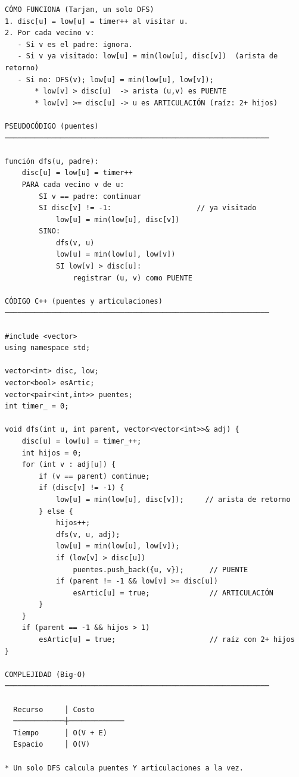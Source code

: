 \begin{lstlisting}
CÓMO FUNCIONA (Tarjan, un solo DFS)
1. disc[u] = low[u] = timer++ al visitar u.
2. Por cada vecino v:
   - Si v es el padre: ignora.
   - Si v ya visitado: low[u] = min(low[u], disc[v])  (arista de retorno)
   - Si no: DFS(v); low[u] = min(low[u], low[v]);
       * low[v] > disc[u]  -> arista (u,v) es PUENTE
       * low[v] >= disc[u] -> u es ARTICULACIÓN (raíz: 2+ hijos)

PSEUDOCÓDIGO (puentes)
──────────────────────────────────────────────────────────────

función dfs(u, padre):
    disc[u] = low[u] = timer++
    PARA cada vecino v de u:
        SI v == padre: continuar
        SI disc[v] != -1:                    // ya visitado
            low[u] = min(low[u], disc[v])
        SINO:
            dfs(v, u)
            low[u] = min(low[u], low[v])
            SI low[v] > disc[u]:
                registrar (u, v) como PUENTE

CÓDIGO C++ (puentes y articulaciones)
──────────────────────────────────────────────────────────────

#include <vector>
using namespace std;

vector<int> disc, low;
vector<bool> esArtic;
vector<pair<int,int>> puentes;
int timer_ = 0;

void dfs(int u, int parent, vector<vector<int>>& adj) {
    disc[u] = low[u] = timer_++;
    int hijos = 0;
    for (int v : adj[u]) {
        if (v == parent) continue;
        if (disc[v] != -1) {
            low[u] = min(low[u], disc[v]);     // arista de retorno
        } else {
            hijos++;
            dfs(v, u, adj);
            low[u] = min(low[u], low[v]);
            if (low[v] > disc[u])
                puentes.push_back({u, v});      // PUENTE
            if (parent != -1 && low[v] >= disc[u])
                esArtic[u] = true;              // ARTICULACIÓN
        }
    }
    if (parent == -1 && hijos > 1)
        esArtic[u] = true;                      // raíz con 2+ hijos
}

COMPLEJIDAD (Big-O)
──────────────────────────────────────────────────────────────

  Recurso     │ Costo
  ────────────┼─────────────
  Tiempo      │ O(V + E)
  Espacio     │ O(V)

* Un solo DFS calcula puentes Y articulaciones a la vez.
\end{lstlisting}

